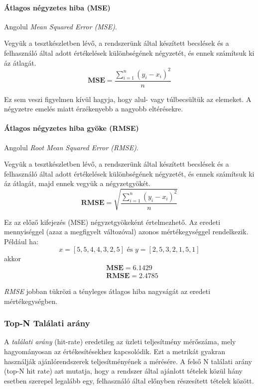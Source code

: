 \documentclass[
]{thesis-ekf}
\theoremstyle{definition}
\theoremstyle{remark}
\begin{document}
\paragraph{Átlagos négyzetes hiba (MSE)}
\label{p:MSE}
Angolul \emph{Mean Squared Error (MSE)}.

Vegyük a tesztkészletben lévő, a rendszerünk által készített becslések és a felhasználó által adott értékelések különbségének négyzetét, és ennek számítsuk ki áz átlagát.
\[ \mathbf{MSE} = \frac{\sum^{n}_{i=1}(y_{i}-x_{i})^{2}}{n}\]

Ez sem veszi figyelmen kívül hagyja, hogy alul- vagy túlbecsültük az elemeket. A négyzetre emelés miatt érzékenyebb a nagyobb eltérésekre.


\paragraph{Átlagos négyzetes hiba gyöke (RMSE)}
\label{p:RMSE}
Angolul \emph{Root Mean Squared Error (RMSE)}.

Vegyük a tesztkészletben lévő, a rendszerünk által készített becslések és a felhasználó által adott értékelések különbségének négyzetét, és ennek számítsuk ki áz átlagát, majd ennek vegyük a négyzetgyökét.
\[ \mathbf{RMSE} = \sqrt{\frac{\sum^{n}_{i=1}(y_{i}-x_{i})^{2}}{n}}\]

Ez az előző kifejezés (MSE) négyzetgyökeként értelmezhető. Az eredeti mennyiséggel (azaz a megfigyelt változóval) azonos mértékegységgel rendelkezik. Például ha:
\[x=[5,5,4,4,3,2,5] \text{ és } y=[2,5,3,2,1,5,1]\]
akkor
\begin{align*}
	& \mathbf{MSE} = 6.1429 \\
	& \mathbf{RMSE} = 2.4785
\end{align*}

\emph{RMSE} jobban tükrözi a tényleges átlagos hiba nagyságát az eredeti mértékegységben.

\subsubsection{Top-N Találati arány}
\label{subsubsec-hit-rate}
A \emph{találati arány} (hit-rate) eredetileg az üzleti teljesítmény mérőszáma, mely hagyományosan az értékesítésekhez kapcsolódik.\cite{wiki-hit-rate} 
Ezt a metrikát gyakran használják ajánlórendszerek teljesítményének a mérésére. A felső N találati arány (top-N hit rate) azt mutatja, hogy a rendszer által ajánlott tételek közül hány esetben szerepel legalább egy, felhasználó által előnyben részesített tételek között.\cite{recommendation-system-evaluation-metrics}
\end{document}
